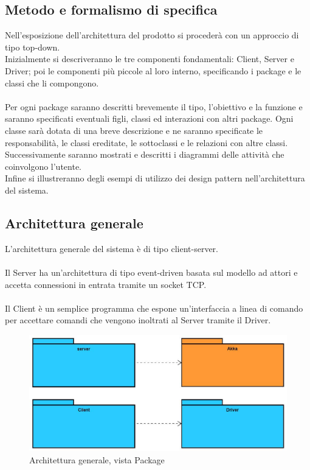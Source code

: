 \documentclass[a4paper]{article}
\begin{document}
		\subsection{Metodo e formalismo di specifica}
			Nell'esposizione dell'architettura del prodotto si procederà con un approccio di tipo top-down. \\
			Inizialmente si descriveranno le tre componenti fondamentali: Client, Server e Driver; poi le componenti più piccole al loro interno, 
			specificando i package e le classi che li compongono. \\ \\
			Per ogni package saranno descritti brevemente il tipo, l'obiettivo e la funzione e saranno specificati eventuali figli, classi ed 
			interazioni con altri package. Ogni classe sarà dotata di una breve descrizione e ne saranno specificate le responsabilità, 
			le classi ereditate, le sottoclassi e le relazioni con altre classi. \\
			Successivamente saranno mostrati e descritti i diagrammi delle attività che coinvolgono l'utente. \\
			Infine si illustreranno degli esempi di utilizzo dei design pattern nell'architettura del sistema.
			
		\subsection{Architettura generale}
        	L'architettura generale del sistema è di tipo client-server. \\ \\
            Il Server ha un'architettura di tipo event-driven basata sul modello ad attori e accetta connessioni in entrata tramite un socket TCP. \\ \\
			Il Client è un semplice programma che espone un'interfaccia a linea di comando per accettare comandi che vengono inoltrati al Server tramite 
			il Driver.
            
        \begin{figure} [H]
			\centering
			\includegraphics[width=\textwidth]{ST/generalLevel.jpg}
			\caption{Architettura generale, vista Package}
		\end{figure}
		
\end{document}
